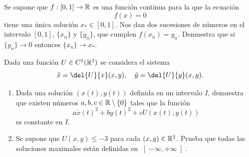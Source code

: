 \documentclass[12pt]{article}
\begin{document}
    \begin{ejercicio}
        Se supone que $f : \left[0, 1\right] \to \mathbb{R}$ es una función continua para la que la ecuación
        \[
        f(x) = 0
        \]
        tiene una única solución $x_* \in \left[0, 1\right]$. Nos dan dos sucesiones de números en el intervalo $\left[0, 1\right]$, $\{x_n\}$ y $\{y_n\}$, que cumplen $f(x_n) = y_n$. Demuestra que si $\{y_n\} \to 0$ entonces $\{x_n\} \to x_*$.
    \end{ejercicio}

    \begin{ejercicio}
        Dada una función $U \in C^1(\mathbb{R}^2)$ se considera el sistema
        \[
        \ddot{x} = \del{U}{x}(x, y), \quad \ddot{y} = \del{U}{y}(x, y).
        \]
        \begin{enumerate}[label=\alph*)]
            \item Dada una solución $(x(t), y(t))$ definida en un intervalo $I$, demuestra que existen números $a, b, c \in \mathbb{R} \setminus \{0\}$ tales que la función
            \[
            a\dot{x}(t)^2 + b\dot{y}(t)^2 + cU(x(t), y(t))
            \]
            es constante en $I$.
            \item Se supone que $U(x, y) \leq -3$ para cada $(x, y) \in \mathbb{R}^2$. Prueba que todas las soluciones maximales están definidas en $\left]-\infty, +\infty\right[$.
        \end{enumerate}
    \end{ejercicio}

    \newpage
    \setcounter{ejercicio}{0} %
\end{document}
